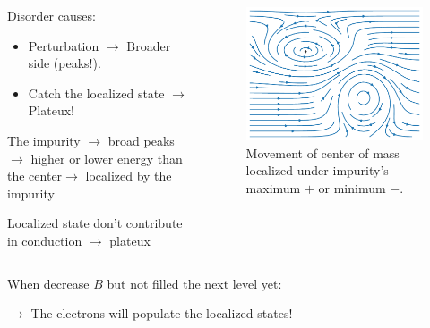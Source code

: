 \documentclass{beamer}
\begin{document}
\begin{frame}
	\begin{columns}
		\begin{column}{0.6\linewidth}
			Disorder causes:\null
			\begin{itemize}
				\item Perturbation \(\to\) Broader side (peaks!).\\
				\item Catch the localized state \(\to\) Plateux!
			\end{itemize}
			\vspace{0.2cm}
The impurity \(\to\) broad peaks \(\to\) higher or lower energy than the center\(\to\) localized by the impurity\vspace{0.1cm}
			\begin{center}
Localized state don't contribute in conduction \(\to\) plateux
			\end{center}
		\end{column}
		\begin{column}{0.4\linewidth}
\begin{figure}
\includegraphics[width = \linewidth]{images/Disorder.pdf}
\caption{Movement of center of mass localized under impurity's maximum \(+\) or minimum \(-\).}
\end{figure}
		\end{column}
	\end{columns}
\vspace{0.2cm}
When decrease \(B\) but not filled the next level yet:
	\begin{center}
	\(\to\) The electrons will populate the localized states!
	\end{center}
\end{frame}
\end{document}
